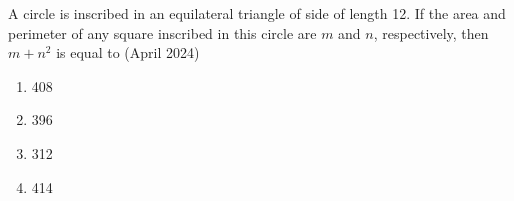     \item A circle is inscribed in an equilateral triangle of side of length 12. If the area and perimeter of any square inscribed in this circle are $m$ and $n$, respectively, then $m+n^2$ is equal to 
\hfill{(April 2024)} 
\begin{enumerate}
        \item 408
        \item 396
        \item 312
        \item 414
    \end{enumerate}
    
 
